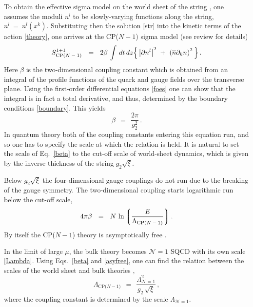 \documentclass[12pt]{article}
\def\beq{\begin{equation}}
\def\eeq{\end{equation}}
\newcommand{\none}{${\mathcal N}=1$ }
\newcommand{\p}{\partial}
\newcommand{\ov}{\overline}
\newcommand{\mc}[1]{\mathcal{#1}}
\newcommand{\lgr}{\left\lgroup}
\newcommand{\rgr}{\right\rgroup}
\newcommand{\nbar}{\ov{n}}
\begin{document}
	To obtain the effective sigma model on the world sheet of the string \cite{ABEKY,SYmon,GSY05}, 
	one assumes the moduli $ n^l $ to be slowly-varying functions along the string, $ n^l ~=~ n^l(x^k) $.
	Substituting then the solution \eqref{str} into the kinetic terms of the action \eqref{theory}, one
	arrives at the CP($N-1$) sigma model (see review \cite{SYrev} for details)
\begin{align}
\label{cp}
	S_{\text{CP($N-1$)}}^{1+1} ~~=~~ 2\beta\, \int\, dt\,dz 
					\Bigl\{\, \left|\p n^l\right|^2    
						  ~+~  \left(\nbar \p_k n\right)^2\,
					\Bigr\}\,.
\end{align}
	Here $ \beta $ is the two-dimensional coupling constant which is obtained from an integral of
	the profile functions of the quark and gauge fields over the transverse plane. 
	Using the first-order differential equations \eqref{foes} one can show that the integral
	is in fact a total derivative, and thus, determined by the boundary conditions \eqref{boundary}.
	This yields 
\beq
\label{beta}
	\beta ~~=~~ \frac{2\pi}{g_2^2}\,.
\eeq
	In quantum theory both of the coupling constants entering this equation run, and so one has 
	to specify the scale at which the relation is held.
	It is natural to set the scale of Eq.~\eqref{beta} to the cut-off scale of world-sheet dynamics,
	which is given by the inverse thickness of the string $ g_2 \sqrt{\xi} $.

	Below $ g_2\sqrt{\xi} $ the four-dimensional gauge couplings do not run due to the breaking
	of the gauge symmetry. 
	The two-dimensional coupling starts logarithmic run below the cut-off scale,
\beq
\label{asyfree}
	4 \pi \beta ~~=~~ N\,  \ln \lgr \frac{E}{\Lambda_\text{CP($N-1$)}} \rgr.
\eeq
	By itself the CP($N-1$) theory is asymptotically free \cite{P75}.

	In the limit of large $ \mu $, the bulk theory becomes \none SQCD with its own scale \eqref{Lambda}.
	Using Eqs.~\eqref{beta} and \eqref{asyfree}, one can find the relation between the scales
	of the world sheet and bulk theories \cite{GSYmmodel}, 
\beq
\label{cpscale}
	\Lambda_\text{CP($N-1$)} ~~=~~ \frac{ \Lambda_{\mc{N}=1}^2 } { g_2\, \sqrt{\xi}}\,,
\eeq
	where the coupling constant is determined by the scale $ \Lambda_{\mc{N}=1} $.
\end{document}
